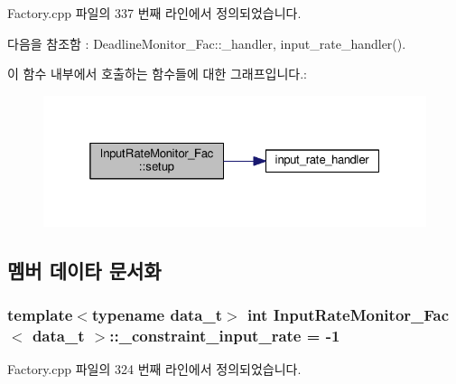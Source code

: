 Factory.\+cpp 파일의 337 번째 라인에서 정의되었습니다.



다음을 참조함 \+:  Deadline\+Monitor\+\_\+\+Fac\+::\+\_\+handler, input\+\_\+rate\+\_\+handler().



이 함수 내부에서 호출하는 함수들에 대한 그래프입니다.\+:\nopagebreak
\begin{figure}[H]
\begin{center}
\leavevmode
\includegraphics[width=325pt]{classInputRateMonitor__Fac_afced13486e1a312384898c7754063ff9_cgraph}
\end{center}
\end{figure}




\subsection{멤버 데이타 문서화}
\subsubsection[{\texorpdfstring{\+\_\+constraint\+\_\+input\+\_\+rate}{_constraint_input_rate}}]{\setlength{\rightskip}{0pt plus 5cm}template$<$typename data\+\_\+t$>$ int {\bf Input\+Rate\+Monitor\+\_\+\+Fac}$<$ data\+\_\+t $>$\+::\+\_\+constraint\+\_\+input\+\_\+rate = -\/1\hspace{0.3cm}{\ttfamily [private]}}\hypertarget{classInputRateMonitor__Fac_a9d144656510782c1ff3d34714b5fff0d}{}\label{classInputRateMonitor__Fac_a9d144656510782c1ff3d34714b5fff0d}


Factory.\+cpp 파일의 324 번째 라인에서 정의되었습니다.

